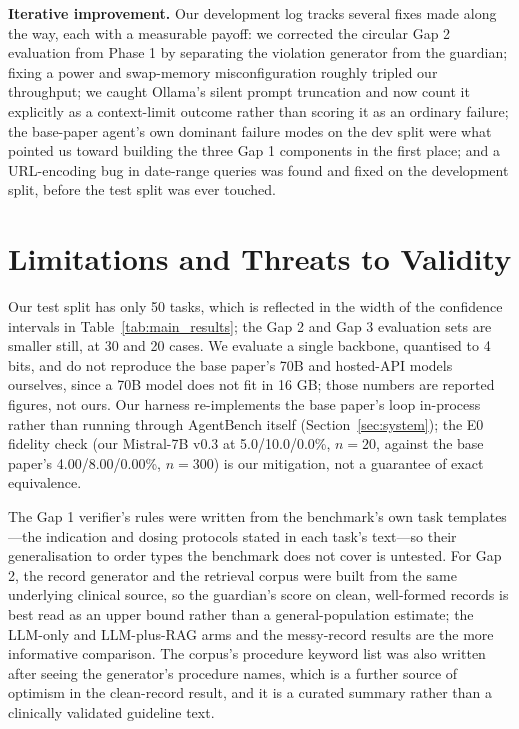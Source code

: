 \documentclass[conference]{IEEEtran}
\begin{document}
\textbf{Iterative improvement.} Our development log tracks several fixes made along the way, each with a measurable payoff: we corrected the circular Gap 2 evaluation from Phase 1 by separating the violation generator from the guardian; fixing a power and swap-memory misconfiguration roughly tripled our throughput; we caught Ollama's silent prompt truncation and now count it explicitly as a context-limit outcome rather than scoring it as an ordinary failure; the base-paper agent's own dominant failure modes on the dev split were what pointed us toward building the three Gap 1 components in the first place; and a URL-encoding bug in date-range queries was found and fixed on the development split, before the test split was ever touched.

\section{Limitations and Threats to Validity}

Our test split has only 50 tasks, which is reflected in the width of the confidence intervals in Table~\ref{tab:main_results}; the Gap 2 and Gap 3 evaluation sets are smaller still, at 30 and 20 cases. We evaluate a single backbone, quantised to 4 bits, and do not reproduce the base paper's 70B and hosted-API models ourselves, since a 70B model does not fit in 16 GB; those numbers are reported figures, not ours. Our harness re-implements the base paper's loop in-process rather than running through AgentBench itself (Section~\ref{sec:system}); the E0 fidelity check (our Mistral-7B v0.3 at 5.0/10.0/0.0\%, $n=20$, against the base paper's 4.00/8.00/0.00\%, $n=300$) is our mitigation, not a guarantee of exact equivalence.

The Gap 1 verifier's rules were written from the benchmark's own task templates---the indication and dosing protocols stated in each task's text---so their generalisation to order types the benchmark does not cover is untested. For Gap 2, the record generator and the retrieval corpus were built from the same underlying clinical source, so the guardian's score on clean, well-formed records is best read as an upper bound rather than a general-population estimate; the LLM-only and LLM-plus-RAG arms and the messy-record results are the more informative comparison. The corpus's procedure keyword list was also written after seeing the generator's procedure names, which is a further source of optimism in the clean-record result, and it is a curated summary rather than a clinically validated guideline text.
\end{document}
